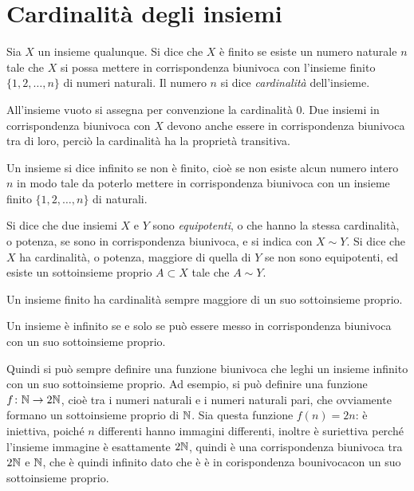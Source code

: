 \section{Cardinalità degli insiemi}
\begin{definizione}
Sia $X$ un insieme qualunque. Si dice che $X$ è finito se esiste un numero naturale $n$ tale che $X$ si possa mettere in corrispondenza biunivoca con l'insieme finito $\{1,2,\dots,n\}$ di numeri naturali. Il numero $n$ si dice \emph{cardinalità} dell'insieme.
\end{definizione}
All'insieme vuoto si assegna per convenzione la cardinalità 0.
Due insiemi in corrispondenza biunivoca con $X$ devono anche essere in corrispondenza biunivoca tra di loro, perciò la cardinalità ha la proprietà transitiva.
\begin{definizione}
Un insieme si dice infinito se non è finito, cioè se non esiste alcun numero intero $n$ in modo tale da poterlo mettere in corrispondenza biunivoca con un insieme finito $\{1,2,\dots,n\}$ di naturali.
\end{definizione}
\begin{definizione}
Si dice che due insiemi $X$ e $Y$ sono \emph{equipotenti}, o che hanno la stessa cardinalità, o potenza, se sono in corrispondenza biunivoca, e si indica con $X\sim Y$.
Si dice che $X$ ha cardinalità, o potenza, maggiore di quella di $Y$ se non sono equipotenti, ed esiste un sottoinsieme proprio $A\subset X$ tale che $A\sim Y$.
\end{definizione}
Un insieme finito ha cardinalità sempre maggiore di un suo sottoinsieme proprio.

\begin{teorema}
Un insieme è infinito se e solo se può essere messo in corrispondenza biunivoca con un suo sottoinsieme proprio.
\end{teorema}
Quindi si può sempre definire una funzione biunivoca che leghi un insieme infinito con un suo sottoinsieme proprio. Ad esempio, si può definire una funzione $f\colon\mathbb{N}\to 2\mathbb{N}$, cioè tra i numeri naturali e i numeri naturali pari, che ovviamente formano un sottoinsieme proprio di $\mathbb{N}$. Sia questa funzione $f(n)=2n$: è iniettiva, poiché $n$ differenti hanno immagini differenti, inoltre è suriettiva perché l'insieme immagine è esattamente $2\mathbb{N}$, quindi è una corrispondenza biunivoca tra $2\mathbb{N}$ e $\mathbb{N}$, che è quindi infinito dato che è è in corispondenza bounivocacon un suo sottoinsieme proprio.

